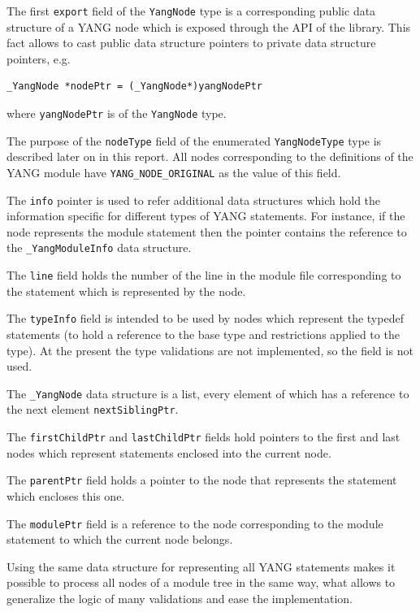\documentclass[conference]{IEEEtran}
\begin{document}
The first \texttt{export} field of the \texttt{YangNode} type is a corresponding public data structure of a YANG node which is exposed through the API of the library. This fact allows to cast public data structure pointers to private data structure pointers, e.g.
\small
\begin{verbatim}
_YangNode *nodePtr = (_YangNode*)yangNodePtr
\end{verbatim}
\normalsize
where \texttt{yangNodePtr} is of the \texttt{YangNode} type.

The purpose of the \texttt{nodeType} field of the enumerated \texttt{YangNodeType} type is described later on in this report. All nodes corresponding to the  definitions of the YANG module have \texttt{YANG\_NODE\_ORIGINAL} as the value of this field.

The \texttt{info} pointer is used to  refer additional data structures which hold the information specific for different types of YANG statements. For instance, if the node represents the module statement then the pointer contains the reference to the \texttt{\_YangModuleInfo} data structure.

The \texttt{line} field holds the number of the line in the module file corresponding to the statement which is represented by the node.

The \texttt{typeInfo} field is intended to be used by nodes which represent the typedef statements (to hold a reference to the base type and restrictions applied to the type). At the present the type validations are not implemented, so the field is not used.

The \texttt{\_YangNode} data structure is a list, every element of which has a reference to the next element \texttt{nextSiblingPtr}. 

The \texttt{firstChildPtr}  and \texttt{lastChildPtr} fields hold pointers to the first and last nodes which represent statements enclosed into the current node.

The \texttt{parentPtr}  field holds a pointer to the node that represents the statement which encloses this one.

The \texttt{modulePtr}  field is a reference to the node corresponding to the module statement to which  the current node belongs.

Using the same data structure for representing all YANG statements makes it possible to process all nodes of a module tree in the same way, 
what allows to generalize the logic of many validations and ease the implementation.
\end{document}
